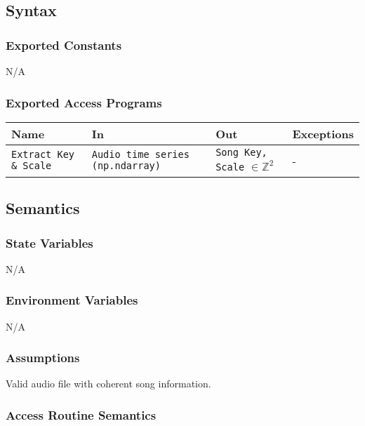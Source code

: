 \documentclass[12pt, titlepage]{article}
\begin{document}
\subsection{Syntax}

\subsubsection{Exported Constants}
N/A

\subsubsection{Exported Access Programs}

\begin{center}
\begin{tabular}{p{2cm} p{4cm} p{4cm} p{2cm}}
\hline
\textbf{Name} & \textbf{In} & \textbf{Out} & \textbf{Exceptions}\\
\hline%
\texttt{Extract Key \& Scale} &\texttt{Audio time series (np.ndarray)} &\texttt{Song Key, Scale} $\in \mathbb{Z}^2$ &-\\
\hline
\end{tabular}
\end{center}

\subsection{Semantics}

\subsubsection{State Variables}
N/A

\subsubsection{Environment Variables}
N/A

\subsubsection{Assumptions}
Valid audio file with coherent song information.

\subsubsection{Access Routine Semantics}
\end{document}
